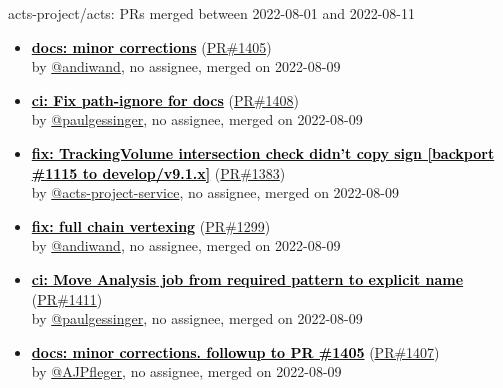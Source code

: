 \begin{frame}[allowframebreaks]{ acts-project/acts: PRs merged 
between 2022-08-01 and 2022-08-11
}
\begin{itemize}
    \item
    \prmerged\textbf{\href{https://github.com/acts-project/acts/pull/1405}{\textcolor{black}{docs: minor corrections}}}
    (\href{https://github.com/acts-project/acts/pull/1405}{PR\#1405}) \\
    by \href{https://github.com/andiwand}{@andiwand}, {}no assignee, merged on 2022-08-09

    \item
    \prmerged\textbf{\href{https://github.com/acts-project/acts/pull/1408}{\textcolor{black}{ci: Fix path-ignore for docs}}}
    (\href{https://github.com/acts-project/acts/pull/1408}{PR\#1408}) \\
    by \href{https://github.com/paulgessinger}{@paulgessinger}, {}no assignee, merged on 2022-08-09

    \item
    \prmerged\textbf{\href{https://github.com/acts-project/acts/pull/1383}{\textcolor{black}{fix: TrackingVolume intersection check didn't copy sign [backport \#1115 to develop/v9.1.x]}}}
    (\href{https://github.com/acts-project/acts/pull/1383}{PR\#1383}) \\
    by \href{https://github.com/acts-project-service}{@acts-project-service}, {}no assignee, merged on 2022-08-09

    \item
    \prmerged\textbf{\href{https://github.com/acts-project/acts/pull/1299}{\textcolor{black}{fix: full chain vertexing}}}
    (\href{https://github.com/acts-project/acts/pull/1299}{PR\#1299}) \\
    by \href{https://github.com/andiwand}{@andiwand}, {}no assignee, merged on 2022-08-09

    \item
    \prmerged\textbf{\href{https://github.com/acts-project/acts/pull/1411}{\textcolor{black}{ci: Move Analysis job from required pattern to explicit name}}}
    (\href{https://github.com/acts-project/acts/pull/1411}{PR\#1411}) \\
    by \href{https://github.com/paulgessinger}{@paulgessinger}, {}no assignee, merged on 2022-08-09

    \item
    \prmerged\textbf{\href{https://github.com/acts-project/acts/pull/1407}{\textcolor{black}{docs: minor corrections. followup to PR \#1405}}}
    (\href{https://github.com/acts-project/acts/pull/1407}{PR\#1407}) \\
    by \href{https://github.com/AJPfleger}{@AJPfleger}, {}no assignee, merged on 2022-08-09


\end{itemize}
\end{frame}

